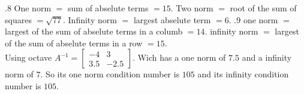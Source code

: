 \documentclass[12pt]{article}
\makeatletter
\theoremstyle{homework}
\newenvironment{exercise}[1]
{\def\@currentlabel{#1}\exercisecore}
{\endexercisecore}
\makeatother
\begin{document}
\begin{exercise}

7.8
\end{exercise}
One norm $=$ sum of abselute terms $=15$.  
Two norm $=$ root of the sum of squares $=\sqrt{77}$.  
Infinity norm $=$ largest abselute term $=6$.
\begin{exercise}

7.9
\end{exercise}
one norm $=$ largest of the sum of abselute terms in a columb $=14$.
infinity norm $=$ largest of the sum of abselute terms in a row $=15$.\\
Using octave $A^{-1}=\begin{bmatrix}
-4&3\\3.5&-2.5
\end{bmatrix}$.  Wich has a one norm of $7.5$ and a infinity norm of $7$.  So its one norm condition number is $105$ and its infinity condition number is $105$.
\end{document}
